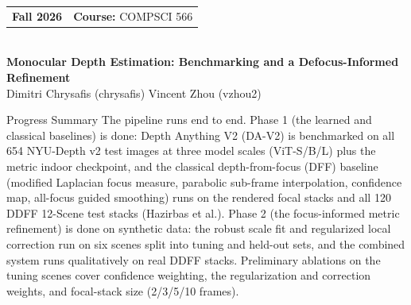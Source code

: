 \documentclass[11pt]{article}
\newcommand{\Course}{COMPSCI 566}
\newcommand{\Assignment}{Project Midterm Report}
\newcommand{\ProjectTitle}{Monocular Depth Estimation: Benchmarking and a Defocus-Informed Refinement}
\newcommand{\Date}{\today}
\begin{document}
\begin{tcolorbox}[
  enhanced,
  arc=2.5mm,
  boxrule=0pt,
  colback=TitleBg,
  colframe=TitleBg,
  borderline south={1.5pt}{0pt}{Secondary},
  title={\textcolor{white}{\Assignment\ \textbullet\ \Date}},
  coltitle=white,
  fonttitle=\bfseries,
  before skip=0pt,
  after skip=5pt
]
  {\color{white}
  \begin{tabular*}{\textwidth}{@{\extracolsep{\fill}}ll}
    \textbf{Fall 2026} & \textbf{Course:} \Course
  \end{tabular*}\\[3pt]
  {\color{white}\textbf{\ProjectTitle}}\\[2pt]
  {\color{white}\small Dimitri Chrysafis (chrysafis) \quad Vincent Zhou (vzhou2)}
  }
\end{tcolorbox}


\begin{reportbox}{Progress Summary}
The pipeline runs end to end. Phase 1 (the learned and classical
baselines) is done: Depth Anything V2 (DA-V2) is benchmarked
on all 654 NYU-Depth v2 test images at three model scales
(ViT-S/B/L) plus the metric indoor checkpoint, and the classical
depth-from-focus (DFF) baseline (modified Laplacian focus measure,
parabolic sub-frame interpolation, confidence map, all-focus guided
smoothing) runs on the rendered focal stacks and all 120 DDFF
12-Scene test stacks (Hazirbas et al.). Phase 2 (the focus-informed
metric refinement) is done on synthetic data: the robust scale fit and
regularized local correction run on six scenes split into tuning and
held-out sets, and the combined system runs qualitatively on real
DDFF stacks. Preliminary ablations on the tuning scenes cover
confidence weighting, the regularization and correction weights, and
focal-stack size (2/3/5/10 frames).
\end{reportbox}
\end{document}
